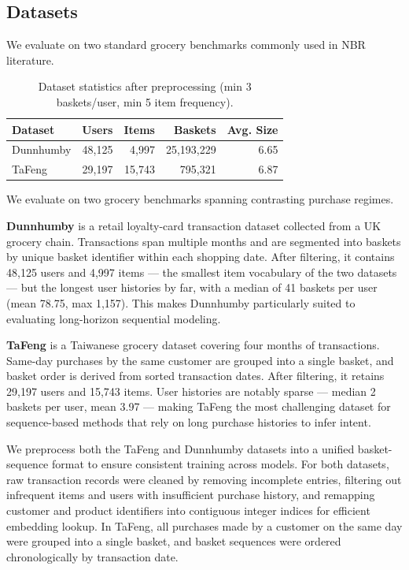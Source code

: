 \documentclass[conference]{IEEEtran}
\begin{document}
\subsection{Datasets}

We evaluate on two standard grocery benchmarks commonly used in NBR literature.

\begin{table}[h]
\centering
\caption{Dataset statistics after preprocessing (min 3 baskets/user, min 5 item frequency).}
\label{tab:datasets}
\begin{tabular}{lrrrr}
\toprule
\textbf{Dataset} & \textbf{Users} & \textbf{Items} & \textbf{Baskets} & \textbf{Avg. Size} \\
\midrule
Dunnhumby  & 48,125 & 4,997 & 25,193,229 & 6.65 \\
TaFeng     & 29,197 & 15,743 &    795,321 & 6.87 \\
\bottomrule
\end{tabular}
\end{table}

We evaluate on two grocery benchmarks spanning contrasting purchase regimes.

\textbf{Dunnhumby} is a retail loyalty-card transaction dataset collected from a
UK grocery chain. Transactions span multiple months and are segmented into
baskets by unique basket identifier within each shopping date. After filtering,
it contains 48,125 users and 4,997 items — the smallest item vocabulary of the
two datasets — but the longest user histories by far, with a median of 41
baskets per user (mean 78.75, max 1,157). This makes Dunnhumby particularly
suited to evaluating long-horizon sequential modeling.

\textbf{TaFeng} is a Taiwanese grocery dataset covering four
months of transactions. Same-day purchases by the same customer are grouped into
a single basket, and basket order is derived from sorted transaction dates.
After filtering, it retains 29,197 users and 15,743 items. User histories are
notably sparse — median 2 baskets per user, mean 3.97 — making TaFeng the most
challenging dataset for sequence-based methods that rely on long purchase
histories to infer intent.

We preprocess both the TaFeng and Dunnhumby datasets into a unified basket-sequence format to ensure consistent training across models. For both datasets, raw transaction records were cleaned by removing incomplete entries, filtering out infrequent items and users with insufficient purchase history, and remapping customer and product identifiers into contiguous integer indices for efficient embedding lookup. In TaFeng, all purchases made by a customer on the same day were grouped into a single basket, and basket sequences were ordered chronologically by transaction date.
\end{document}
